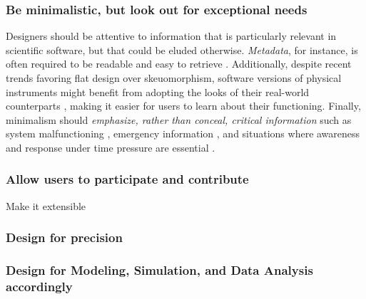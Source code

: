 \subsubsection{Be minimalistic, but look out for exceptional needs}

Designers should be attentive to information that is particularly relevant in scientific software, but that could be eluded otherwise. \emph{Metadata}, for instance, is often required to be readable and easy to retrieve  \cite{Talbott:2005, Baxter:2006, Macaulay:2009, Keefe:2010, DeMatos:2013, bestprSC, Thomer:2016}. Additionally, despite recent trends favoring flat design over skeuomorphism, software versions of physical instruments might benefit from adopting the looks of their real-world counterparts \cite{Foster:1998}, making it easier for users to learn about their functioning.  Finally, minimalism should \emph{emphasize, rather than conceal, critical information} such as system malfunctioning \cite{Morais:2014}, emergency information \cite{Ferguson:2016}, and situations where awareness and response under time pressure are essential \cite{Aragon:2008}.  


\subsubsection{Allow users to participate and contribute} Make it extensible

\subsubsection{Design for precision}

\subsubsection{Design for Modeling, Simulation, and Data Analysis accordingly}

